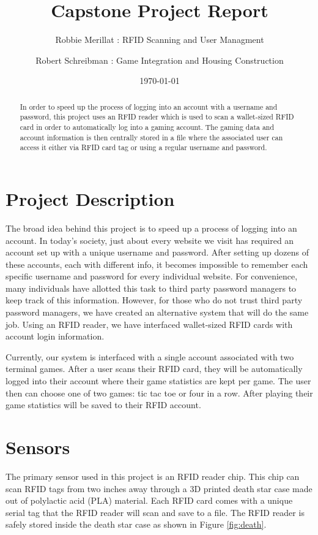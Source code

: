 \documentclass[notitlepage,11pt]{article}
\title{Capstone Project Report}
\author{Robbie Merillat : RFID Scanning and User Managment}
\author{Robert Schreibman : Game Integration and Housing Construction}
\date{\today}
\begin{document}
    \maketitle
    \begin{abstract}
        In order to speed up the process of logging into an account with a 
        username and password, this project uses an RFID reader which is 
        used to scan a wallet-sized RFID card in order to automatically log 
        into a gaming account. The gaming data and account information is then 
        centrally stored in a file where the associated user can access it either 
        via RFID card tag or using a regular username and password.
    \end{abstract}

    \newpage

    \section{Project Description}
        The broad idea behind this project is to speed up a process of logging into 
        an account. In today’s society, just about every website we visit has required 
        an account set up with a unique username and password. After setting up dozens of 
        these accounts, each with different info, it becomes impossible to remember each 
        specific username and password for every individual website. For convenience, 
        many individuals have allotted this task to third party password managers to 
        keep track of this information. However, for those who do not trust third 
        party password managers, we have created an alternative system that will do 
        the same job. Using an RFID reader, we have interfaced wallet-sized RFID 
        cards with account login information. 

        Currently, our system is interfaced with a single account associated with two terminal games. After a user scans their RFID card, they will be automatically logged into their account where their game statistics are kept per game. The user then can choose one of two games: tic tac toe or four in a row. After playing their game statistics will be saved to their RFID account.
    \section{Sensors}

        The primary sensor used in this project is an RFID reader chip. This 
        chip can scan RFID tags from two inches away through a 3D printed death 
        star case made out of polylactic acid (PLA) material. Each RFID card comes 
        with a unique serial tag that the RFID reader will scan and save to a file. 
        The RFID reader is safely stored inside the death star case as shown in Figure 
        \ref{fig:death}.
\end{document}
